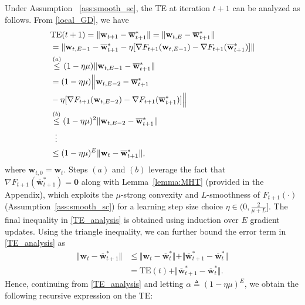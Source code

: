 \documentclass[conference]{IEEEtran}
\begin{document}
Under Assumption ~\ref{ass:smooth_sc}, the TE at iteration $t+1$ can be analyzed as follows. From \eqref{local_GD}, we have
\begin{align}
&\text{TE}(t+1)
=\Vert \mathbf{w}_{t+1} - \overline{\mathbf{w}}^*_{t+1}  \Vert = \Vert \mathbf{w}_{t,E} - \overline{\mathbf{w}}^*_{t+1}  \Vert\\
&=\Vert \mathbf{w}_{t,E-1} - \overline{\mathbf{w}}^*_{t+1}
- \eta[\nabla F_{t+1}(\mathbf{w}_{t,E-1}) -\nabla F_{t+1}(\overline{\mathbf{w}}^*_{t+1})
]
\Vert  \nonumber\\
&\overset{(a)}{\leq} (1 - \eta \mu) \Vert \mathbf{w}_{t,E-1} - \overline{\mathbf{w}}^*_{t+1}\Vert \nonumber\\
&= (1 - \eta \mu) \Big\Vert \mathbf{w}_{t,E-2}-  \overline{\mathbf{w}}^*_{t+1}\\&
-\eta[\nabla F_{t+1}(\mathbf{w}_{t,E-2})
-\nabla F_{t+1}(\overline{\mathbf{w}}^*_{t+1})]
\Big\Vert \nonumber\\
&\overset{(b)}{\leq} (1 - \eta \mu)^2 \Vert \mathbf{w}_{t,E-2} - \overline{\mathbf{w}}^*_{t+1}\Vert  \nonumber\\
    &\hspace{2mm}\vdots
    \nonumber\\
    &\leq(1 - \eta \mu)^E \Vert \mathbf{w}_{t} - \overline{\mathbf{w}}^*_{t+1}\Vert,
    \label{TE_analysis}
\end{align}
where $\mathbf{w}_{t,0} = \mathbf{w}_t$. Steps $(a)$ and $(b)$ leverage the fact that $\nabla F_{t+1}(\overline{\mathbf{w}}^*_{t+1})=\mathbf 0$ along with Lemma~\ref{lemma:MHT} (provided in the Appendix), which exploits the $\mu$-strong convexity and $L$-smoothness of $F_{t+1}(\cdot)$ (Assumption~\ref{ass:smooth_sc}) for a learning step size choice $\eta \in (0, \frac{2}{\mu + L}]$. The final inequality in \eqref{TE_analysis} is obtained using induction over $E$ gradient updates. Using the triangle inequality, we can further bound the error term in \eqref{TE_analysis} as
\begin{align*}    
\Vert \mathbf{w}_{t} - \overline{\mathbf{w}}^*_{t+1}\Vert&\leq\Vert \mathbf{w}_{t} - \overline{\mathbf{w}}^*_{t}\Vert
+
\Vert\overline{\mathbf{w}}^*_{t+1}-\overline{\mathbf{w}}^*_{t}\Vert\\
&=\text{TE}(t)+
\Vert\overline{\mathbf{w}}^*_{t+1}-\overline{\mathbf{w}}^*_{t}\Vert.
\end{align*}
Hence, continuing from 
\eqref{TE_analysis} and letting $\alpha \triangleq (1-\eta \mu)^E$, we obtain the following recursive expression on the TE:
\end{document}
